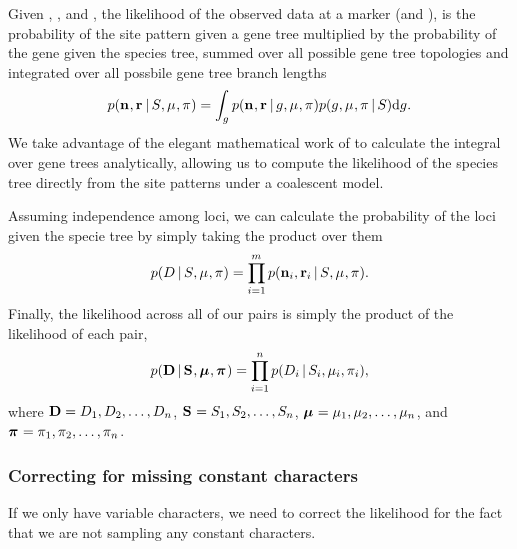 Given \murate, \gfreq, \comparisondivtime and \comparisonpopsizes, the
likelihood of the observed data at a marker (\allelecount and \redallelecount),
is the probability of the site pattern given a gene tree multiplied by the
probability of the gene given the species tree, summed over all possible gene
tree topologies and integrated over all possbile gene tree branch lengths
\begin{equation}
    \pr(\leafallelecounts, \leafredallelecounts \given \sptree, \murate, \gfreq)
    =
    \int_{\genetree}
    \pr(\leafallelecounts, \leafredallelecounts \given \genetree, \murate, \gfreq)
    \pr(\genetree, \murate, \gfreq \given \sptree)
    \diff{\genetree}.
    \label{eq:markerlikelihood}
\end{equation}
We take advantage of the elegant mathematical work of \citep{Bryant2012} to
calculate the integral over gene trees analytically, allowing us to compute the
likelihood of the species tree directly from the site patterns under a
coalescent model.

Assuming independence among loci, we can calculate the probability of the
\nloci loci given the specie tree by simply taking the product over them
\begin{equation}
    \pr(\comparisondata \given \sptree, \murate, \gfreq)
    =
    \prod_{i=1}^{\nloci}
    \pr(\leafallelecounts[i], \leafredallelecounts[i] \given \sptree, \murate, \gfreq).
    \label{eq:comparisonlikelihood}
\end{equation}
Finally, the likelihood across all of our pairs is simply the product of the
likelihood of each pair,
\begin{equation}
    \pr(
    \alldata
    \given
    \sptrees,
    \murates,
    \gfreqs)
    =
    \prod_{i=1}^{\ncomparisons}
    \pr(\comparisondata[i] \given \sptree[i], \murate[i], \gfreq[i]),
    \label{eq:collectionlikelihood}
\end{equation}
where
$\alldata = \comparisondata[1], \comparisondata[2], \ldots, \comparisondata[\ncomparisons]$,
$\sptrees = \sptree[1], \sptree[2], \ldots, \sptree[\ncomparisons]$,
$\murates = \murate[1], \murate[2], \ldots, \murate[\ncomparisons]$,
and
$\gfreqs = \gfreq[1], \gfreq[2], \ldots, \gfreq[\ncomparisons]$.


\subsubsection{Correcting for missing constant characters}
If we only have variable characters, we need to correct the likelihood for the
fact that we are not sampling any constant characters.

